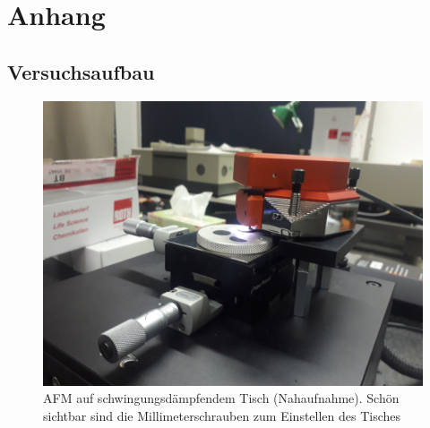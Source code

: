 

\chapter{Anhang}
\label{chap:anhangA}


\section{Versuchsaufbau}
\label{section:AnhangAufbau} 

\begin{figure}[h]
    \centering
    \includegraphics[width = \linewidth]{Bilder/Aufbau/20210920093605.jpg}
    \caption{AFM auf schwingungsdämpfendem Tisch (Nahaufnahme). Schön sichtbar sind die Millimeterschrauben zum Einstellen des Tisches}
\end{figure}

